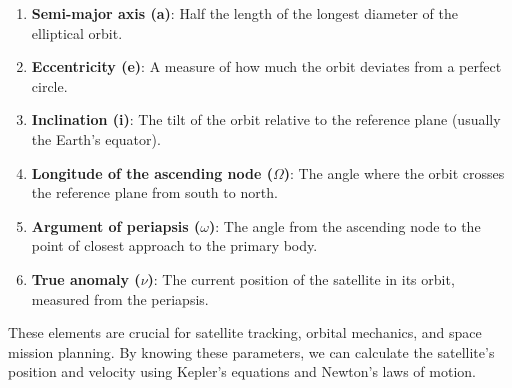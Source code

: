 \begin{enumerate}
    \item \textbf{Semi-major axis (a)}: Half the length of the longest diameter of the elliptical orbit.
    \item \textbf{Eccentricity (e)}: A measure of how much the orbit deviates from a perfect circle.
    \item \textbf{Inclination (i)}: The tilt of the orbit relative to the reference plane (usually the Earth's equator).
    \item \textbf{Longitude of the ascending node ($\Omega$)}: The angle where the orbit crosses the reference plane from south to north.
    \item \textbf{Argument of periapsis ($\omega$)}: The angle from the ascending node to the point of closest approach to the primary body.
    \item \textbf{True anomaly ($\nu$)}: The current position of the satellite in its orbit, measured from the periapsis.
\end{enumerate}

These elements are crucial for satellite tracking, orbital mechanics, and space mission planning. By knowing these parameters, we can calculate the satellite's position and velocity using Kepler's equations and Newton's laws of motion.

